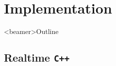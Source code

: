 \documentclass[10pt,aspectratio=169]{beamer}
\begin{document}
\section[Implementation]{Implementation}
\begin{frame}<beamer>{Outline}
\end{frame}

\subsection[RTCPP]{Realtime \texttt{C++}}

%  
\end{document}
